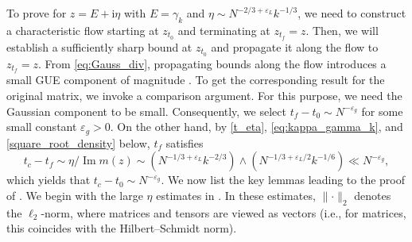 \documentclass[10pt,reqno]{amsart}
\numberwithin{equation}{section}
\numberwithin{figure}{section}
\theoremstyle{plain} %
\theoremstyle{definition} %
\renewcommand{\r}{\mathrm} \newcommand{\rr}{\mathrm} %
\newcommand{\ii}{\mathrm{i}}
\newcommand{\pa}[1]{\left({#1}\right)}
\newcommand{\norm}[1]{\lVert #1 \rVert}
\DeclareMathOperator{\im}{\mathrm{Im}}
\numberwithin{equation}{section}
\begin{document}
To prove  for $z=E+\ii \eta$ with $E=\gamma_k$ and $\eta\sim N^{-2/3+\varepsilon_L}k^{-1/3}$, we need to construct a characteristic flow starting at $z_{t_0}$ and terminating at $z_{t_f}=z$. Then, we will establish a sufficiently sharp bound at $z_{t_0}$ and propagate it along the flow to $z_{t_f}=z$. From \eqref{eq:Gauss_div}, propagating bounds along the flow introduces a small GUE component of magnitude \smash{$\sqrt{1-\r e^{-(t_f-t_0)}}\sim \sqrt{t_f-t_0}$}. To get the corresponding result for the original matrix, we invoke a comparison argument. For this purpose, we need the Gaussian component to be small. Consequently, we select $t_f-t_0\sim N^{-\varepsilon_g}$ for some small constant $\varepsilon_g>0$. On the other hand, by \eqref{t_eta}, \eqref{eq:kappa_gamma_k}, and \eqref{square_root_density} below, $t_f$ satisfies 
\[t_c-t_f\sim \eta/\im m (z) \sim \pa{N^{-1/3+\varepsilon_L}k^{-2/3}}\wedge \pa{N^{-1/3+\varepsilon_L/2}k^{-1/6}}\ll N^{-\varepsilon_g},\] 
which yields that $t_c-t_0\sim N^{-\varepsilon_g}$.
We now list the key lemmas leading to the proof of . We begin with the large $\eta$ estimates in . 
In these estimates, $\norm{\cdot}_2$ denotes the $\ell_2$-norm, where matrices and tensors are viewed as vectors (i.e., for matrices, this coincides with the Hilbert–Schmidt norm).
\end{document}
